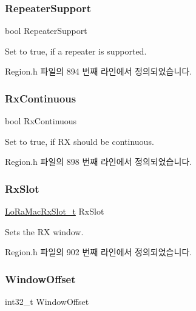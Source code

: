 \subsubsection{\texorpdfstring{Repeater\+Support}{RepeaterSupport}}
{\footnotesize\ttfamily bool Repeater\+Support}

Set to true, if a repeater is supported. 

Region.\+h 파일의 894 번째 라인에서 정의되었습니다.

\mbox{\label{structs_rx_config_params_ad155d9bae95f09d927ca588dc4f4734a}} 
\subsubsection{\texorpdfstring{Rx\+Continuous}{RxContinuous}}
{\footnotesize\ttfamily bool Rx\+Continuous}

Set to true, if RX should be continuous. 

Region.\+h 파일의 898 번째 라인에서 정의되었습니다.

\mbox{\label{structs_rx_config_params_a0a258bf8cfad5219bfd579257e523fc1}} 
\subsubsection{\texorpdfstring{Rx\+Slot}{RxSlot}}
{\footnotesize\ttfamily \mbox{\hyperlink{group___l_o_r_a_m_a_c_ga082bd3322087fa2f42c902a0b360ff4f}{Lo\+Ra\+Mac\+Rx\+Slot\+\_\+t}} Rx\+Slot}

Sets the RX window. 

Region.\+h 파일의 902 번째 라인에서 정의되었습니다.

\mbox{\label{structs_rx_config_params_a9d092276960345e3b06ba105cf0c8b98}} 
\subsubsection{\texorpdfstring{Window\+Offset}{WindowOffset}}
{\footnotesize\ttfamily int32\+\_\+t Window\+Offset}

